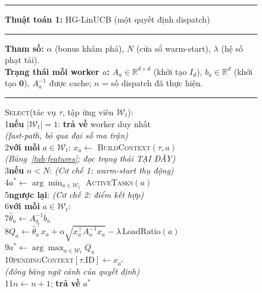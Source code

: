 \documentclass[final,5p,times,twocolumn]{elsarticle}
\begin{document}
\begin{figure}[H]
\centering
\begin{minipage}{\columnwidth}
\footnotesize
\hrule\vspace{3pt}
\textbf{Thuật toán 1:} HG-LinUCB (một quyết định dispatch)
\vspace{3pt}\hrule\vspace{4pt}
\noindent\textbf{Tham số:} $\alpha$ (bonus khám phá), $N$ (cửa sổ warm-start), $\lambda$ (hệ số phạt tải).\\
\noindent\textbf{Trạng thái mỗi worker $a$:} $A_a\in\mathbb{R}^{d\times d}$ (khởi tạo $I_d$), $b_a\in\mathbb{R}^d$ (khởi tạo $\mathbf{0}$), $A_a^{-1}$ được cache; $n$ = số dispatch đã thực hiện.
\vspace{4pt}\hrule\vspace{4pt}
\noindent\textsc{Select}(tác vụ $\tau$, tập ứng viên $\mathcal{W}_t$):\\
\hspace*{0.6em}1\quad \textbf{nếu} $|\mathcal{W}_t|=1$: \textbf{trả về} worker duy nhất\\
\hspace*{2.2em}\textit{(fast-path, bỏ qua đại số ma trận)}\\
\hspace*{0.6em}2\quad \textbf{với mỗi} $a\in\mathcal{W}_t$: $x_a\leftarrow$ \textsc{BuildContext}$(\tau,a)$\\
\hspace*{2.2em}\textit{(Bảng~\ref{tab:features}; đọc trạng thái TẠI ĐÂY)}\\
\hspace*{0.6em}3\quad \textbf{nếu} $n<N$: \textit{(Cơ chế 1: warm-start thụ động)}\\
\hspace*{0.6em}4\quad\quad $a^*\leftarrow\arg\min_{a\in\mathcal{W}_t}$ \textsc{ActiveTasks}$(a)$\\
\hspace*{0.6em}5\quad \textbf{ngược lại}: \textit{(Cơ chế 2: điểm kết hợp)}\\
\hspace*{0.6em}6\quad\quad \textbf{với mỗi} $a\in\mathcal{W}_t$:\\
\hspace*{0.6em}7\quad\quad\quad $\hat\theta_a\leftarrow A_a^{-1}b_a$\\
\hspace*{0.6em}8\quad\quad\quad $Q_a\leftarrow\hat\theta_a^\top x_a+\alpha\sqrt{x_a^\top A_a^{-1}x_a}-\lambda\,\text{LoadRatio}(a)$\\
\hspace*{0.6em}9\quad\quad $a^*\leftarrow\arg\max_{a\in\mathcal{W}_t}Q_a$\\
\hspace*{0.3em}10\quad \textsc{pendingContext}$[\tau.\text{ID}]\leftarrow x_{a^*}$\\
\hspace*{2.2em}\textit{(đóng băng ngữ cảnh của quyết định)}\\
\hspace*{0.3em}11\quad $n\leftarrow n+1$; \textbf{trả về} $a^*$
\vspace{4pt}


\end{minipage}
\end{figure}
\end{document}
